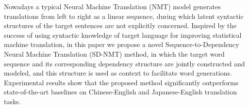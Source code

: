 Nowadays a typical Neural Machine Translation (NMT) model generates translations from left to right as a linear sequence, during which latent syntactic structures of the target sentences are not explicitly concerned. Inspired by the success of using syntactic knowledge of target language for improving statistical machine translation, in this paper we propose a novel Sequence-to-Dependency Neural Machine Translation (SD-NMT) method, in which the target word sequence and its corresponding dependency structure are jointly constructed and modeled, and this structure is used as context to facilitate word generations. Experimental results show that the proposed method significantly outperforms state-of-the-art baselines on Chinese-English and Japanese-English translation tasks.

